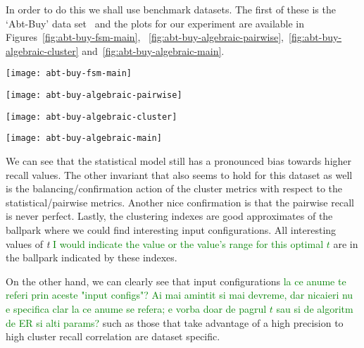In order to do this we shall use benchmark datasets.
The first of these is the `Abt-Buy' data set~\cite{vldb2010} and the plots for
our experiment are available in Figures~\ref{fig:abt-buy-fsm-main},
~\ref{fig:abt-buy-algebraic-pairwise},~\ref{fig:abt-buy-algebraic-cluster}
and~\ref{fig:abt-buy-algebraic-main}.

\begin{figure*}[ht]
    \begin{minipage}{0.24\textwidth}
        \centering
        \texttt{[image: abt-buy-fsm-main]}
        \caption{Abt-Buy statistical metrics.}
        \label{fig:abt-buy-fsm-main}
    \end{minipage}
    \begin{minipage}{0.24\textwidth}
        \centering
        \texttt{[image: abt-buy-algebraic-pairwise]}
        \caption{Abt-Buy pairwise metrics.}
        \label{fig:abt-buy-algebraic-pairwise}
    \end{minipage}
    \begin{minipage}{0.24\textwidth}
        \centering
        \texttt{[image: abt-buy-algebraic-cluster]}
        \caption{Abt-Buy cluster metrics.}
        \label{fig:abt-buy-algebraic-cluster}
    \end{minipage}
    \begin{minipage}{0.24\textwidth}
        \centering
        \texttt{[image: abt-buy-algebraic-main]}
        \caption{Abt-Buy clustering indexes.}
        \label{fig:abt-buy-algebraic-main}
    \end{minipage}
\end{figure*}\label{abt-buy}

We can see that the statistical model still has a pronounced bias towards higher
recall values.
The other invariant that also seems to hold for this dataset as well is the
balancing/confirmation action of the cluster metrics with respect to the
statistical/pairwise metrics.
Another nice confirmation is that the pairwise recall is never perfect.
Lastly, the clustering indexes are good approximates of the ballpark where
we could find  interesting input configurations.
All interesting values of \textit{t} 
\textcolor{green}{I would indicate the value or the value's range for this optimal $t$} 
are in the ballpark indicated by these
indexes.

On the other hand, we can clearly see that input configurations 
\textcolor{green}{la ce anume te referi prin aceste "input configs"? Ai mai amintit si mai devreme, dar nicaieri nu e specifica clar la ce anume se refera; e vorba doar de pagrul $t$ sau si de algoritm de ER si alti params?}  
such as those
that take advantage of a high precision to high cluster recall correlation are
dataset specific.

